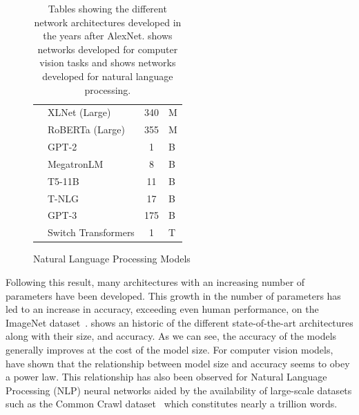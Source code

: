 \begin{table}[t]
\begin{subfigure}[b]{\textwidth}
\begin{tabular}{
      L{4.5cm}
      L{4.5cm}
      S[table-format=3.0, table-text-alignment=left]@{\,}
      s[table-unit-alignment=left]
    }
      \citet{yang2019xlnet}          & XLNet (Large)   & 340 & \si{M} \\
      \citet{liu2019roberta}         & RoBERTa (Large) & 355 & \si{M} \\
      \citet{radford2019language}    & GPT-2           &   1 & \si{B} \\
      \citet{shoeybi2019megatron}    & MegatronLM      &   8 & \si{B} \\
      \citet{raffel2020exploring}    & T5-11B          &  11 & \si{B} \\
      \citet{rosset2020turingnlg}    & T-NLG           &  17 & \si{B} \\
      \citet{brown2020language}      & GPT-3           & 175 & \si{B} \\
      \citet{fedus2021switch}        & Switch Transformers & 1 & \si{T} \\
      \bottomrule
    \end{tabular}
    \caption{Natural Language Processing Models}
    \label{table:ch1-networks_parameters_nlp}
  \end{subfigure}
  \par\bigskip
  \caption{
    Tables showing the different network architectures developed in the years after AlexNet.
     shows networks developed for computer vision tasks and  shows networks developed for natural language processing.
  }
  \label{table:ch1-networks_parameters}
\end{table}


Following this result, many architectures with an increasing number of parameters have been developed.
This growth in the number of parameters has led to an increase in accuracy, exceeding even human performance, on the ImageNet dataset~\cite{he2015delving}.
 shows an historic of the different state-of-the-art architectures along with their size, and accuracy.
As we can see, the accuracy of the models generally improves at the cost of the model size.
For computer vision models, \citet{tan2019efficientnet} have shown that the relationship between model size and accuracy seems to obey a power law.
This relationship has also been observed for Natural Language Processing (NLP) neural networks \cite{rosenfeld2020a,kaplan2020scaling} aided by the availability of large-scale datasets such as the Common Crawl dataset~\cite{raffel2019exploring} which constitutes nearly a trillion words.

